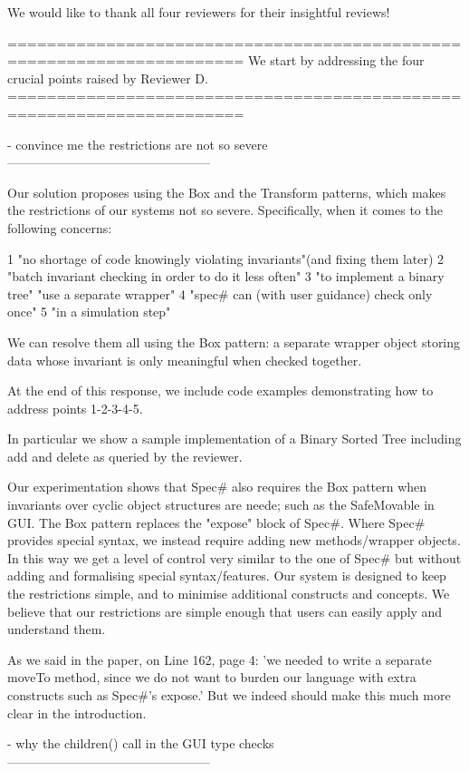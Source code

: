 We would like to thank all four reviewers for their insightful reviews!

======================================================================
We start by addressing the four crucial points raised by Reviewer D.
======================================================================


- convince me the restrictions are not so severe
------------------------------------------------

Our solution proposes using the Box and the Transform patterns, which makes the restrictions of our systems not so severe. Specifically, when it comes to the following concerns:

1 "no shortage of code knowingly violating invariants"(and fixing them later)
2 "batch invariant checking in order to do it less often"
3 "to implement a binary tree" "use a separate wrapper"
4 "spec# can (with user guidance) check only once"
5 "in a simulation step"

We can resolve them all using the Box pattern: a separate wrapper object storing data whose invariant
is only meaningful when checked together.

At the end of this response, we include code examples demonstrating how to address points 1-2-3-4-5.

In particular we show a sample implementation of a Binary Sorted Tree including add and delete as queried by the reviewer.

Our experimentation shows that Spec# also requires the Box pattern when
invariants over cyclic object structures are neede; such as the SafeMovable in GUI.
The Box pattern replaces the "expose" block of Spec#.
Where Spec# provides special syntax, we instead require adding new methods/wrapper
objects. In this way we get a level of control very similar to the one of Spec#
but without adding and formalising special syntax/features.
Our system is designed to keep the restrictions simple, and to minimise additional constructs and concepts.
We believe that our restrictions are simple enough that users can easily apply and understand them.

As we said in the paper, on Line 162, page 4: 'we needed to write a separate moveTo method, since we do not want to burden our language with extra constructs such as Spec#’s expose.' But we indeed should make this much more clear in the introduction.


- why the children() call in the GUI type checks
------------------------------------------------

